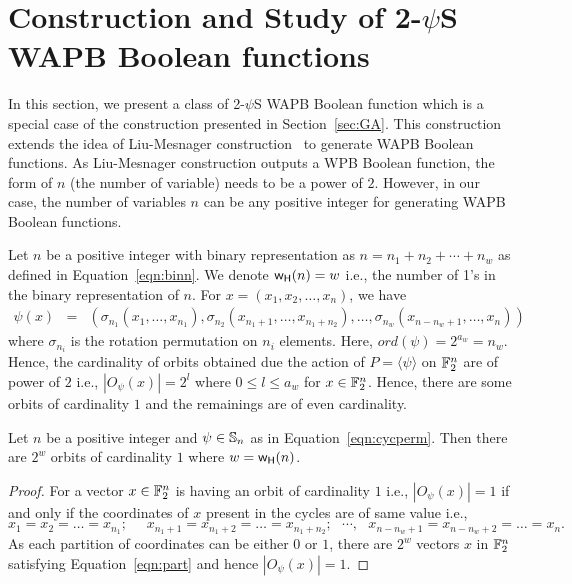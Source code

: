 \documentclass{llncs}
\begin{document}
\section{Construction and Study of 2-$\psi$S WAPB Boolean functions}\label{sec:ELM}
In this section, we present a class of 2-$\psi$S WAPB Boolean function which is a special case of the construction presented in Section~\ref{sec:GA}. This construction extends the idea of Liu-Mesnager construction~\cite{DCC:LiuMes19} to generate WAPB Boolean functions. As Liu-Mesnager construction outputs a WPB Boolean function, the form of $n$ (the number of variable) needs to be a power of $2$. However, in our case, the number of variables $n$ can be any positive integer for generating WAPB Boolean functions.

Let $n$ be a positive integer with binary representation as
$n =  n_1 + n_2 + \cdots + n_w$ as defined in Equation~\ref{eqn:binn}.
We denote $\mathsf{w_H}(n) = w$ i.e., the number of 1's in the binary representation of $n$.
For $x = (x_1, x_2, \ldots, x_n)$, we have
\begin{eqnarray}\label{eqn:cycperm1}
\psi(x) & = & (\sigma_{n_1}(x_1,\ldots,x_{n_1}), \sigma_{n_2}(x_{n_1+1},\ldots,x_{n_1+n_2}), \ldots, \sigma_{n_w}(x_{n-n_w+1},\ldots,x_n))
\end{eqnarray}
where $\sigma_{n_i}$ is the rotation permutation on $n_i$ elements.
Here, $ord(\psi) = 2^{a_w} = n_w$. Hence, the cardinality of orbits obtained due the action of $P = \langle \psi \rangle$ on $\mathbb{F}_2^n$ are of power of $2$ i.e., $|O_\psi(x)| = 2^l$ where $0 \leq l \leq a_w$ for $x \in \mathbb{F}_2^n$.
Hence, there are some orbits of cardinality $1$ and the remainings are of even cardinality. 
\begin{lemma}\label{lem:orbNo}
Let $n$ be a positive integer and $\psi \in \mathbb{S}_n$ as in Equation~\ref{eqn:cycperm}. Then there are $2^w$ orbits of cardinality $1$ where $w = \mathsf{w_H}(n)$.
\end{lemma}
\begin{proof}
For a vector $x \in \mathbb{F}_2^n$ is having an orbit of cardinality $1$ i.e., $|O_\psi(x)| = 1$ if and only if the coordinates of $x$ present in the cycles are of same value i.e., 
\begin{equation}\label{eqn:part}
x_1  = x_2 = \ldots = x_{n_1}; ~~~~~~ x_{n_1+1}  = x_{n_1+2} = \ldots = x_{n_1+n_2}; ~~~ \cdots, ~~~ x_{n-n_w+1}  = x_{n-n_w+2} = \ldots = x_n.
\end{equation}
As each partition of coordinates can be either $0$ or $1$, there are $2^w$ vectors $x$ in $\mathbb{F}_2^n$ satisfying Equation~\ref{eqn:part} and hence $|O_\psi(x)| = 1$.
\end{proof}
\end{document}
